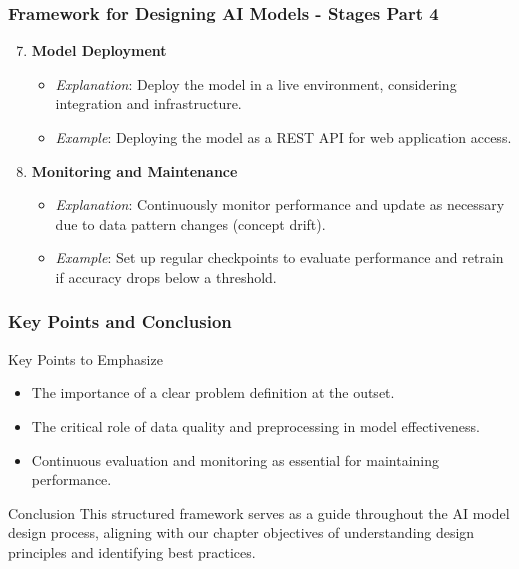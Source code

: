 \documentclass[aspectratio=169]{beamer}
\begin{document}
\begin{frame}[fragile]
    \frametitle{Framework for Designing AI Models - Stages Part 4}
    \begin{enumerate}
        \setcounter{enumi}{6} %
        \item \textbf{Model Deployment}
        \begin{itemize}
            \item \textit{Explanation}: Deploy the model in a live environment, considering integration and infrastructure.
            \item \textit{Example}: Deploying the model as a REST API for web application access.
        \end{itemize}

        \item \textbf{Monitoring and Maintenance}
        \begin{itemize}
            \item \textit{Explanation}: Continuously monitor performance and update as necessary due to data pattern changes (concept drift).
            \item \textit{Example}: Set up regular checkpoints to evaluate performance and retrain if accuracy drops below a threshold.
        \end{itemize}
    \end{enumerate}
\end{frame}

\begin{frame}[fragile]
    \frametitle{Key Points and Conclusion}
    \begin{block}{Key Points to Emphasize}
        \begin{itemize}
            \item The importance of a clear problem definition at the outset.
            \item The critical role of data quality and preprocessing in model effectiveness.
            \item Continuous evaluation and monitoring as essential for maintaining performance.
        \end{itemize}
    \end{block}
    
    \begin{block}{Conclusion}
        This structured framework serves as a guide throughout the AI model design process, aligning with our chapter objectives of understanding design principles and identifying best practices.
    \end{block}
\end{frame}
\end{document}
